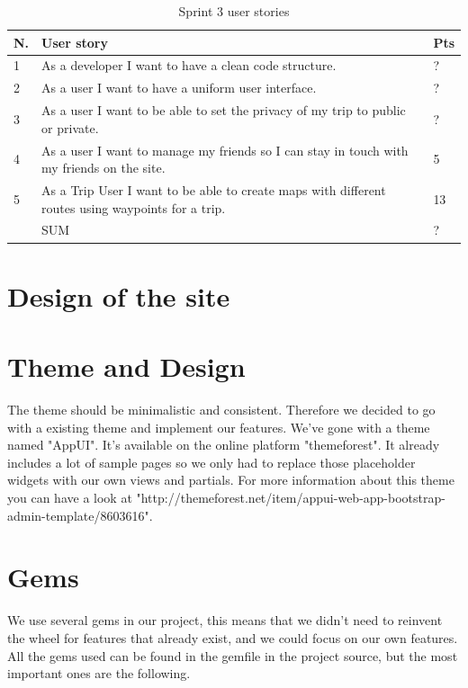 \documentclass[a4paper]{article}
\begin{document}
\begin{table}
  \centering
  \begin{tabulary}{1.0\linewidth}{|L|L|L|}
    \hline
    N. & User story & Pts \\ & As a developer I want to have a clean code structure.
    & ? \\ \hline

    2& As a user I want to have a uniform user interface.
    & ? \\ \hline

    3& As a user I want to be able to set the privacy of my trip to public or private.
    & ? \\ \hline

    4&As a user I want to manage my friends so I can stay in touch with my friends on the site.
    & 5 \\ \hline

    5& As a Trip User I want to be able to create maps with different routes using waypoints for a trip.
    & 13 \\ \hline

    & SUM & ? \\ \hline
  \end{tabulary}
  \caption{Sprint 3 user stories}
\label{tab:sprint3}
\end{table}

\section{Design of the site}
\section{Theme and Design}
The theme should be minimalistic and consistent. Therefore we decided to go with a existing theme and implement our features. We've gone with a theme named "AppUI". It's available on the online platform "themeforest". It already includes a lot of sample pages so we only had to replace those placeholder widgets with our own views and partials. For more information about this theme you can have a look at "http://themeforest.net/item/appui-web-app-bootstrap-admin-template/8603616".

\section{Gems}
We use several gems in our project, this means that we didn't need to reinvent the wheel for features that already exist, and we could focus on our own features. All the gems used can be found in the gemfile in the project source, but the most important ones are the following.
\end{document}
